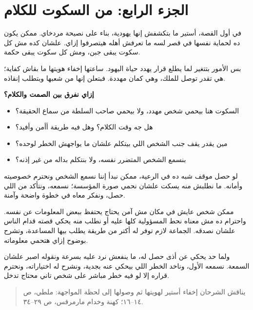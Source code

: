 \documentclass[12pt,a4paper]{article}
\begin{document}
\section*{الجزء الرابع: من السكوت للكلام}
في أول القصة، أستير ما بتكشفش إنها يهودية، بناء على نصيحة مردخاي. ممكن يكون ده لحماية نفسها في قصر لسه ما تعرفش أهله هيتصرفوا إزاي. علشان كده مش كل سكوت يبقى جبن، ومش كل سكوت يبقى حكمة.\par\medskip
بس الأمور بتتغير لما يطلع قرار يهدد حياة اليهود. ساعتها إخفاء هويتها ما بقاش كفاية؛ هي تقدر توصل للملك، وهي كمان مهددة. فبتعلن إنها من شعبها وبتطلب إنقاذه.\par\medskip
\vspace{0.2em}\noindent\textcolor{ochre}{\textbf{إزاي نفرق بين الصمت والكلام؟}}\par\smallskip
\begin{itemize}[rightmargin=1.2em,leftmargin=0.5em,itemsep=0.25em,topsep=0.2em]
\item السكوت هنا بيحمي شخص مهدد، ولا بيحمي صاحب السلطة من سماع الحقيقة؟
\item هل جه وقت الكلام؟ وهل فيه طريقة أأمن وأفيد؟
\item مين يقدر يقف جنب الشخص اللي بيتكلم علشان ما يواجهش الخطر لوحده؟
\item بنسمع الشخص المتضرر نفسه، ولا بنتكلم بداله من غير إذنه؟
\end{itemize}\medskip
لو حصل موقف شبه ده في الرعية، ممكن نبدأ إننا نسمع الشخص ونحترم خصوصيته وأمانه. ما نطلبش منه يسكت علشان نحمي صورة المؤسسة؛ نسمعه، ونتأكد من اللي حصل، ونفكر معاه في خطوة واضحة وآمنة.\par\medskip
ممكن شخص عايش في مكان مش آمن يحتاج يحتفظ ببعض المعلومات عن نفسه. واحترام ده مش معناه نحط المسؤولية كلها عليه أو نطلب منه يحكي قصته قدام الناس علشان نصدقه. الجماعة لازم توفر له أكتر من طريقة يطلب بيها المساعدة، وتشرح بوضوح إزاي هتحمي معلوماته.\par\medskip
ولما حد يحكي عن أذى حصل له، ما ينفعش نرد عليه بسرعة ونقوله اصبر علشان السمعة. نسمعه الأول، وناخد الخطر اللي بيحكي عنه بجدية، ونشرح له اختياراته، ونحترم قراره إلا لو فيه خطر مباشر على شخص تاني محتاج تدخل.\par\medskip
\begin{quote}\small\color{muted}يناقش الشرحان إخفاء أستير لهويتها ثم وصولها إلى لحظة المواجهة: ملطي، ص ١٤–١٦؛ كهنة وخدام مارمرقس، ص ٢٩–٣٤.\end{quote}
\clearpage
\clearpage
\end{document}
